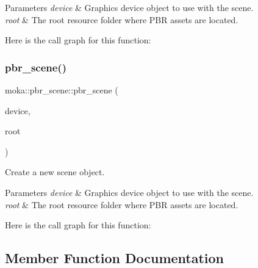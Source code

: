 \begin{DoxyParams}{Parameters}
{\em device} & Graphics device object to use with the scene. \\
\hline
{\em root} & The root resource folder where P\+BR assets are located. \\
\hline
\end{DoxyParams}
Here is the call graph for this function\+:
\mbox{\label{classmoka_1_1pbr__scene_a6a5516f94cf0297f838aa3b819216fe9}} 
\subsubsection{\texorpdfstring{pbr\_scene()}{pbr\_scene()}\hspace{0.1cm}{\footnotesize\ttfamily [2/2]}}
{\footnotesize\ttfamily moka\+::pbr\+\_\+scene\+::pbr\+\_\+scene (\begin{DoxyParamCaption}\item[{\mbox{\hyperlink{classmoka_1_1graphics__device}{graphics\+\_\+device}} \&}]{device,  }\item[{const std\+::filesystem\+::path \&}]{root }\end{DoxyParamCaption})\hspace{0.3cm}{\ttfamily [inline]}}



Create a new scene object. 


\begin{DoxyParams}{Parameters}
{\em device} & Graphics device object to use with the scene. \\
\hline
{\em root} & The root resource folder where P\+BR assets are located. \\
\hline
\end{DoxyParams}
Here is the call graph for this function\+:


\subsection{Member Function Documentation}
\mbox{\label{classmoka_1_1pbr__scene_a520722e6fd897bd9d35cd5c1b6eb14b6}} 
